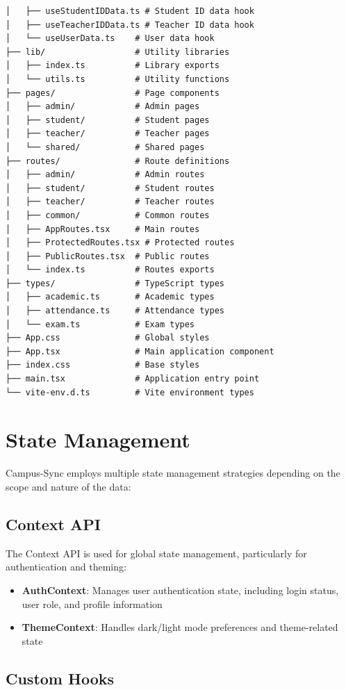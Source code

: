 \begin{verbatim}
│   ├── useStudentIDData.ts # Student ID data hook
│   ├── useTeacherIDData.ts # Teacher ID data hook
│   └── useUserData.ts    # User data hook
├── lib/                  # Utility libraries
│   ├── index.ts          # Library exports
│   └── utils.ts          # Utility functions
├── pages/                # Page components
│   ├── admin/            # Admin pages
│   ├── student/          # Student pages
│   ├── teacher/          # Teacher pages
│   └── shared/           # Shared pages
├── routes/               # Route definitions
│   ├── admin/            # Admin routes
│   ├── student/          # Student routes
│   ├── teacher/          # Teacher routes
│   ├── common/           # Common routes
│   ├── AppRoutes.tsx     # Main routes
│   ├── ProtectedRoutes.tsx # Protected routes
│   ├── PublicRoutes.tsx  # Public routes
│   └── index.ts          # Routes exports
├── types/                # TypeScript types
│   ├── academic.ts       # Academic types
│   ├── attendance.ts     # Attendance types
│   └── exam.ts           # Exam types
├── App.css               # Global styles
├── App.tsx               # Main application component
├── index.css             # Base styles
├── main.tsx              # Application entry point
└── vite-env.d.ts         # Vite environment types
\end{verbatim}

\section{State Management}

Campus-Sync employs multiple state management strategies depending on the scope and nature of the data:

\subsection{Context API}

The Context API is used for global state management, particularly for authentication and theming:

\begin{itemize}
    \item \textbf{AuthContext}: Manages user authentication state, including login status, user role, and profile information
    \item \textbf{ThemeContext}: Handles dark/light mode preferences and theme-related state
\end{itemize}

\subsection{Custom Hooks}

